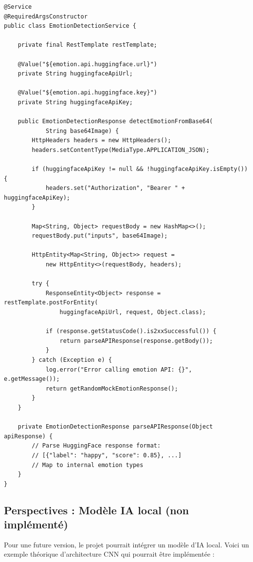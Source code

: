\documentclass[a4paper,11pt]{report}
\begin{document}
\begin{lstlisting}[style=java, caption=Service de détection d'émotions via APIs externes]
@Service
@RequiredArgsConstructor
public class EmotionDetectionService {
    
    private final RestTemplate restTemplate;
    
    @Value("${emotion.api.huggingface.url}")
    private String huggingfaceApiUrl;
    
    @Value("${emotion.api.huggingface.key}")
    private String huggingfaceApiKey;
    
    public EmotionDetectionResponse detectEmotionFromBase64(
            String base64Image) {
        HttpHeaders headers = new HttpHeaders();
        headers.setContentType(MediaType.APPLICATION_JSON);
        
        if (huggingfaceApiKey != null && !huggingfaceApiKey.isEmpty()) {
            headers.set("Authorization", "Bearer " + huggingfaceApiKey);
        }
        
        Map<String, Object> requestBody = new HashMap<>();
        requestBody.put("inputs", base64Image);
        
        HttpEntity<Map<String, Object>> request = 
            new HttpEntity<>(requestBody, headers);
        
        try {
            ResponseEntity<Object> response = restTemplate.postForEntity(
                huggingfaceApiUrl, request, Object.class);
            
            if (response.getStatusCode().is2xxSuccessful()) {
                return parseAPIResponse(response.getBody());
            }
        } catch (Exception e) {
            log.error("Error calling emotion API: {}", e.getMessage());
            return getRandomMockEmotionResponse();
        }
    }
    
    private EmotionDetectionResponse parseAPIResponse(Object apiResponse) {
        // Parse HuggingFace response format:
        // [{"label": "happy", "score": 0.85}, ...]
        // Map to internal emotion types
    }
}
\end{lstlisting}

\subsection{Perspectives : Modèle IA local (non implémenté)}

Pour une future version, le projet pourrait intégrer un modèle d'IA local. Voici un exemple théorique d'architecture CNN qui pourrait être implémentée :
\end{document}
